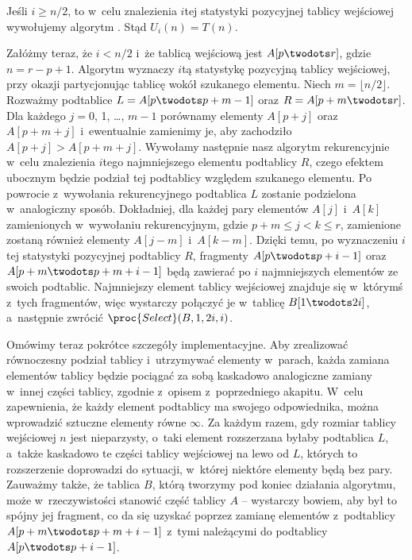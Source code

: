 
\subproblem %

\noindent Jeśli $i\ge n/2$, to w~celu znalezienia $i$\nbhyphen tej statystyki pozycyjnej tablicy wejściowej wywołujemy algorytm .
Stąd $U_i(n)=T(n)$.

Załóżmy teraz, że $i<n/2$ i~że tablicą wejściową jest $A[p\twodots r]$, gdzie $n=r-p+1$.
Algorytm wyznaczy $i$\nbhyphen tą statystykę pozycyjną tablicy wejściowej, przy okazji partycjonując tablicę wokół szukanego elementu.
Niech $m=\lfloor n/2\rfloor$.
Rozważmy podtablice $L=A[p\twodots p+m-1]$ oraz $R=A[p+m\twodots r]$.
Dla każdego $j=0$, 1, \dots, $m-1$ porównamy elementy $A[p+j]$ oraz $A[p+m+j]$ i~ewentualnie zamienimy je, aby zachodziło $A[p+j]>A[p+m+j]$.
Wywołamy następnie nasz algorytm rekurencyjnie w~celu znalezienia $i$\nbhyphen tego najmniejszego elementu podtablicy $R$, czego efektem ubocznym będzie podział tej podtablicy względem szukanego elementu.
Po powrocie z~wywołania rekurencyjnego podtablica $L$ zostanie podzielona w~analogiczny sposób.
Dokładniej, dla każdej pary elementów $A[j]$ i~$A[k]$ zamienionych w~wywołaniu rekurencyjnym, gdzie $p+m\le j<k\le r$, zamienione zostaną również elementy $A[j-m]$ i~$A[k-m]$.
Dzięki temu, po wyznaczeniu $i$\nbhyphen tej statystyki pozycyjnej podtablicy $R$, fragmenty $A[p\twodots p+i-1]$ oraz $A[p+m\twodots p+m+i-1]$ będą zawierać po $i$ najmniejszych elementów ze swoich podtablic.
Najmniejszy element tablicy wejściowej znajduje się w~którymś z~tych fragmentów, więc wystarczy połączyć je w~tablicę $B[1\twodots2i]$, a~następnie zwrócić $\proc{Select}(B,1,2i,i)$.

Omówimy teraz pokrótce szczegóły implementacyjne.
Aby zrealizować równoczesny podział tablicy i~utrzymywać elementy w~parach, każda zamiana elementów tablicy będzie pociągać za sobą kaskadowo analogiczne zamiany w~innej części tablicy, zgodnie z~opisem z~poprzedniego akapitu.
W~celu zapewnienia, że każdy element podtablicy ma swojego odpowiednika, można wprowadzić sztuczne elementy równe $\infty$.
Za każdym razem, gdy rozmiar tablicy wejściowej $n$ jest nieparzysty, o~taki element rozszerzana byłaby podtablica $L$, a~także kaskadowo te części tablicy wejściowej na lewo od $L$, których to rozszerzenie doprowadzi do sytuacji, w~której niektóre elementy będą bez pary.
Zauważmy także, że tablica $B$, którą tworzymy pod koniec działania algorytmu, może w~rzeczywistości stanowić część tablicy $A$ -- wystarczy bowiem, aby był to spójny jej fragment, co da się uzyskać poprzez zamianę elementów z~podtablicy $A[p+m\twodots p+m+i-1]$ z~tymi należącymi do podtablicy $A[p\twodots p+i-1]$.

